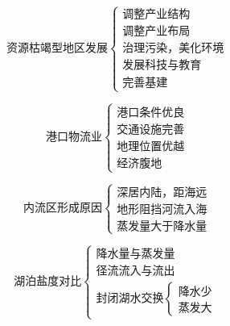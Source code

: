 \documentclass[UTF8]{ctexart}
\begin{document}
\begin{multicols}{2}
    
    \[
        \textbf{资源枯竭型地区发展}
        \begin{cases}
            \text{调整产业结构}\\
            \text{调整产业布局}\\
            \text{治理污染，美化环境}\\
            \text{发展科技与教育}\\
            \text{完善基建}
        \end{cases}
    \]

    \[
        \textbf{港口物流业}
        \begin{cases}
            \text{港口条件优良}\\
            \text{交通设施完善}\\
            \text{地理位置优越}\\
            \text{经济腹地}
        \end{cases}
    \]

\end{multicols}

\par

\begin{multicols}{2}

    \[
        \textbf{内流区形成原因}
        \begin{cases}
            \text{深居内陆，距海远}\\
            \text{地形阻挡河流入海}\\
            \text{蒸发量大于降水量}
        \end{cases}
    \]

    \[
        \textbf{湖泊盐度对比}
        \begin{cases}
            \text{降水量与蒸发量}\\
            \text{径流流入与流出}\\
            \text{封闭湖水交换}
            \begin{cases}
                \text{降水少}\\
                \text{蒸发大}
            \end{cases}
        \end{cases}
    \]

\end{multicols}

\par
\end{document}
